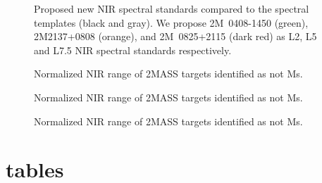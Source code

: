 \documentclass[12pt,preprint]{aastex}
\begin{document}
\begin{figure}
		\caption{Proposed new NIR spectral standards compared to the spectral templates (black and gray).
		We propose 2M~0408-1450 (green), 2M2137+0808 (orange), and 2M~0825+2115 (dark red) as L2, L5 and L7.5 NIR spectral standards respectively.
		}
	\label{fig:templates-newstds}
\end{figure}


\begin{figure}
	\caption{Normalized NIR range of 2MASS targets identified as not Ms.}
	\label{fig:notMs_1}
\end{figure}

\begin{figure}
	\caption{Normalized NIR range of 2MASS targets identified as not Ms.}
\end{figure}

\begin{figure}
	\caption{Normalized NIR range of 2MASS targets identified as not Ms.}
\end{figure}

\clearpage

\section{tables}


\clearpage


\clearpage



\clearpage


\clearpage


\clearpage


\clearpage



\clearpage



%
\clearpage


\clearpage

\end{document}
